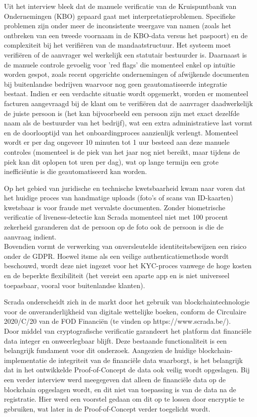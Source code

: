 Uit het interview bleek dat de manuele verificatie van de Kruispuntbank van Ondernemingen (KBO) gepaard gaat met interpretatieproblemen. 
Specifieke problemen zijn onder meer de inconsistente weergave van namen (zoals het ontbreken van een tweede voornaam in de KBO-data versus het paspoort) en de complexiteit bij het verifiëren van de mandaatstructuur. 
Het systeem moet verifiëren of de aanvrager wel werkelijk een statutair bestuurder is. Daarnaast is de manuele controle gevoelig voor 'red flags' die momenteel enkel op intuïtie worden gespot, 
zoals recent opgerichte ondernemingen of afwijkende documenten bij buitenlandse bedrijven waarvoor nog geen geautomatiseerde integratie bestaat. Indien er een verdachte situatie wordt opgemerkt,
worden er momenteel facturen aangevraagd bij de klant om te verifiëren dat de aanvrager daadwerkelijk de juiste persoon is (het kan bijvoorbeeld een persoon zijn met exact dezelfde naam als de bestuurder van het bedrijf), 
wat een extra administratieve last vormt en de doorlooptijd van het onboardingproces aanzienlijk verlengt. Momenteel wordt er per dag ongeveer 10 minuten tot 1 uur besteed aan deze manuele controles (momenteel is de piek 
van het jaar nog niet bereikt, maar tijdens de piek kan dit oplopen tot uren per dag), wat op lange termijn een grote inefficiëntie is die geautomatiseerd kan worden.

Op het gebied van juridische en technische kwetsbaarheid kwam naar voren dat het huidige proces van handmatige uploads (foto's of scans van ID-kaarten) kwetsbaar is voor fraude met vervalste documenten. 
Zonder biometrische verificatie of liveness-detectie kan Scrada momenteel niet met 100 procent zekerheid garanderen dat de persoon op de foto ook de persoon is die de aanvraag indient. \\
Bovendien vormt de verwerking van onversleutelde identiteitsbewijzen een risico onder de GDPR. Hoewel itsme als een veilige authenticatiemethode wordt beschouwd,
wordt deze niet ingezet voor het KYC-proces vanwege de hoge kosten en de beperkte flexibiliteit (het vereist een aparte app en is niet universeel toepasbaar, vooral voor buitenlandse klanten).

Scrada onderscheidt zich in de markt door het gebruik van blockchaintechnologie voor de onveranderlijkheid van digitale wettelijke boeken, conform de Circulaire 2020/C/20 van de FOD Financiën (te vinden op https://www.scrada.be/). 
\\ Door middel van cryptografische verificatie garandeert het platform dat financiële data integer en onweerlegbaar blijft. 
Deze bestaande functionaliteit is een belangrijk fundament voor dit onderzoek. Aangezien de huidige blockchain-implementatie de integriteit van de financiële data waarborgt, 
is het belangrijk dat in het ontwikkelde Proof-of-Concept de data ook veilig wordt opgeslagen. Bij een verder interview werd meegegeven dat alleen de financiële data op de blockchain opgeslagen wordt, en 
dit niet van toepassing is van de data na de registratie. Hier werd een voorstel gedaan om dit op te lossen door encryptie te gebruiken, wat later in de Proof-of-Concept verder toegelicht wordt.


